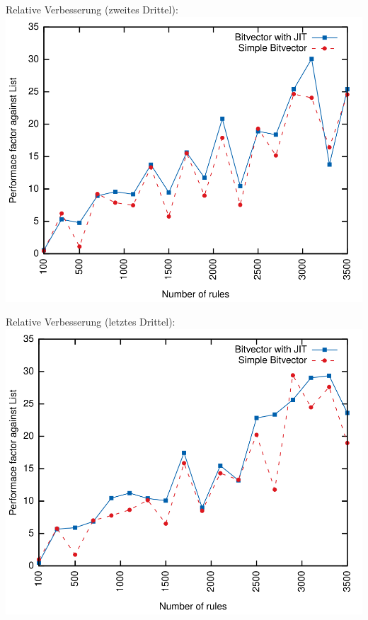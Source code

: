\documentclass[xcolor=x11names,compress]{beamer}
\renewcommand{\(}{\begin{columns}}
\renewcommand{\)}{\end{columns}}
\newcommand{\<}[1]{\begin{column}{#1}}
\renewcommand{\>}{\end{column}}
\begin{document}
\begin{frame}[noframenumbering]
  Relative Verbesserung (zweites Drittel):
  \includegraphics[height=0.9\textheight]{figures/eval_a_relative}
\end{frame}

\begin{frame}[noframenumbering]
  Relative Verbesserung (letztes Drittel):
  \includegraphics[height=0.9\textheight]{figures/eval_w_relative}
\end{frame}
\end{document}
